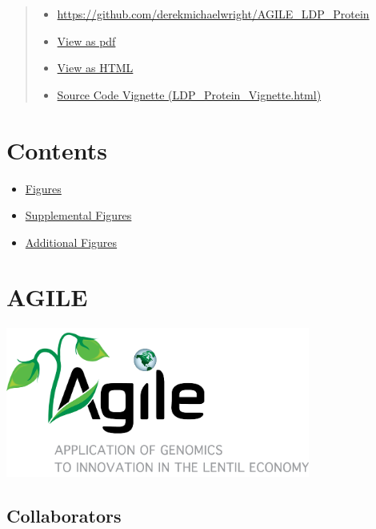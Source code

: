 \documentclass[
]{article}
\providecommand{\tightlist}{%
  \setlength{\itemsep}{0pt}\setlength{\parskip}{0pt}}
\begin{document}
\begin{quote}
\begin{itemize}
\tightlist
\item
  \url{https://github.com/derekmichaelwright/AGILE_LDP_Protein}
\item
  \href{https://github.com/derekmichaelwright/AGILE_LDP_Protein/raw/master/README.pdf}{View
  as pdf}
\item
  \href{https://derekmichaelwright.github.io/AGILE_LDP_Protein/README.html}{View
  as HTML}
\item
  \href{https://derekmichaelwright.github.io/AGILE_LDP_Protein/LDP_Protein_Vignette.html}{Source
  Code Vignette (LDP\_Protein\_Vignette.html)}
\end{itemize}
\end{quote}

\hypertarget{contents}{%
\section{Contents}\label{contents}}

\begin{itemize}
\tightlist
\item
  \protect\hyperlink{figures}{Figures}
\item
  \protect\hyperlink{supplemental-figures}{Supplemental Figures}
\item
  \protect\hyperlink{additional-figures}{Additional Figures}
\end{itemize}

\hypertarget{agile}{%
\section{AGILE}\label{agile}}

\includegraphics[width=0.75\textwidth,height=\textheight]{Additional/img_Agile.png}

\pagebreak

\hypertarget{collaborators}{%
\subsection{Collaborators}\label{collaborators}}
\end{document}
